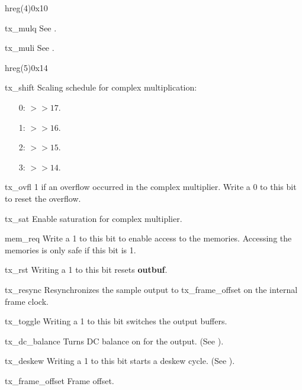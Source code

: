 \documentclass[11pt,technote,a4paper,onecolumn,dvips]{IEEEtran}
\newcommand{\module}[1]{{\ttfamily\bfseries #1}}
\begin{document}
\begin{register}{h}{reg(4)}{0x10}%
    \label{reg4}%
    \regnewline%
    \begin{regdesc}\begin{reglist}[tx\_mulq]
        \item[tx\_mulq] See .
        \item[tx\_muli] See .
    \end{reglist}\end{regdesc}
\end{register}
\begin{register}{h}{reg(5)}{0x14}%
    \label{reg5}%
    \regnewline%
    \begin{regdesc}\begin{reglist}
        \item[tx\_shift] Scaling schedule for complex multiplication:
            \begin{itemize}
                \item[0:] $>> 17$.
                \item[1:] $>> 16$.
                \item[2:] $>> 15$.
                \item[3:] $>> 14$.
            \end{itemize}
        \item[tx\_ovfl] 1 if an overflow occurred in the complex multiplier.
            Write a 0 to this bit to reset the overflow.
        \item[tx\_sat] Enable saturation for complex multiplier.
        \item[mem\_req] Write a 1 to this bit to enable access to the
            memories. Accessing the memories is only safe if this bit is 1.
        \item[tx\_rst] Writing a 1 to this bit resets \module{outbuf}.
        \item[tx\_resync] Resynchronizes the sample output to
            tx\_frame\_offset on the internal frame clock.
        \item[tx\_toggle] Writing a 1 to this bit switches the output buffers.
        \item[tx\_dc\_balance] Turns DC balance on for the output. (See
            \cite[p. 11]{ds90cr485}).
        \item[tx\_deskew] Writing a 1 to this bit starts a deskew cycle. (See
            \cite[p. 12f]{ds90cr485}).
        \item[tx\_frame\_offset] Frame offset.
    \end{reglist}\end{regdesc}
\end{register}
\end{document}
